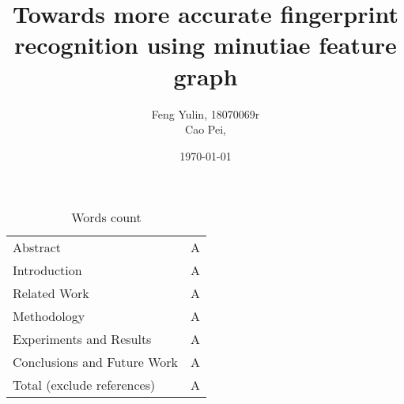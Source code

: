 \documentclass[12pt]{article}
\title{Towards more accurate fingerprint recognition using minutiae feature graph}
\author{Feng Yulin, 18070069r\\Cao Pei, }
\date{\today}
\begin{document}
\maketitle








\vspace{1cm}
\begin{table}[htbp]
	\centering
	\caption{Words count}
	\begin{tabular}{l|c}
		\hline
		Abstract & A \\
		Introduction & A \\
		Related Work & A \\
		Methodology & A \\
		Experiments and Results & A \\
		Conclusions and Future Work & A \\ \hline
		Total (exclude references) & A \\ \hline
	\end{tabular}
\end{table}




\end{document}
